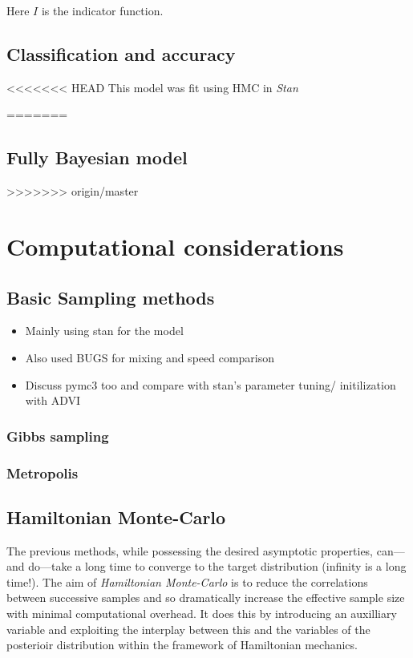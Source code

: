 \documentclass{article}
\begin{document}
Here $I$ is the indicator function.

\subsection{Classification and accuracy}

<<<<<<< HEAD
This model was fit using HMC in \emph{Stan} 

=======
\subsection{Fully Bayesian model}
>>>>>>> origin/master

\section{Computational considerations}

\subsection{Basic Sampling methods}

\begin{itemize}

\item Mainly using stan for the model

\item Also used BUGS for mixing and speed comparison

\item Discuss pymc3 too and compare with stan's parameter tuning/ initilization with ADVI

\end{itemize}

\subsubsection{Gibbs sampling}

\subsubsection{Metropolis}

\subsection{Hamiltonian Monte-Carlo}

The previous methods, while possessing the desired asymptotic properties, can---and do---take a long time to converge to the target distribution (infinity is a long time!). The aim of \emph{Hamiltonian Monte-Carlo} is to reduce the correlations between successive samples and so dramatically increase the effective sample size with minimal computational overhead. It does this by introducing an auxilliary variable and exploiting the interplay between this and the variables of the posterioir distribution within the framework of Hamiltonian mechanics.
\end{document}
